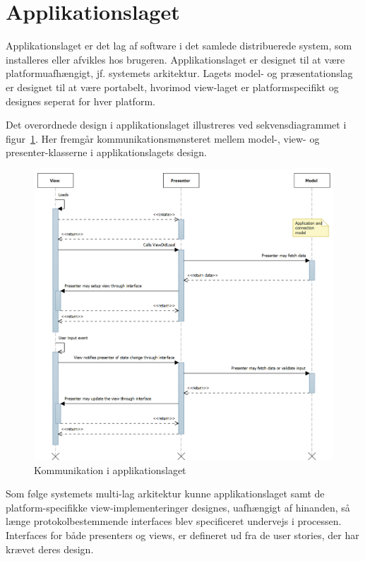 \section{Applikationslaget}
Applikationslaget er det lag af software i det samlede distribuerede system, som installeres eller afvikles hos brugeren. Applikationslaget er designet til at være platformuafhængigt, jf. systemets arkitektur. Lagets model- og præsentationslag er designet til at være portabelt, hvorimod view-laget er platformspecifikt og designes seperat for hver platform. 

Det overordnede design i applikationslaget illustreres ved sekvensdiagrammet i figur~\ref{fig:application_sd}. Her fremgår kommunikationsmønsteret mellem model-, view- og presenter-klasserne i applikationslagets design.

\begin{figure}
	\centering
	\includegraphics[width=1.0\linewidth]{figs/design/application_sd}
	\caption{Kommunikation i applikationslaget}
	\label{fig:application_sd}
\end{figure}

Som følge systemets multi-lag arkitektur kunne applikationslaget samt de platform-specifikke view-implementeringer
designes, uafhængigt af hinanden, så længe protokolbestemmende interfaces blev specificeret undervejs i processen. Interfaces for både presenters og views, er defineret ud fra de user stories, der har krævet deres design.

